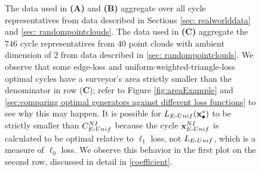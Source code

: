 \begin{figure}[h!]
{The data used in \textbf{(A)} and \textbf{(B)} aggregate over all cycle representatives from data described in Sections \ref{sec: realworlddata} and \ref{sec: randompointclouds}. The data used in \textbf{(C)} aggregate the $746$ cycle representatives from $40$ point clouds with ambient dimension of $2$ from data described in \ref{sec: randompointclouds}. We observe that some edge-loss and uniform-weighted-triangle-loss optimal cycles have a surveyor's area strictly smaller than the denominator in row (\textbf{C}); refer to Figure \ref{fig:areaExample} and \se  \ref{sec:comparing optimal generators against different loss functions} to see why this may happen. It is possible for $L_{E\text{-}Unif}(\mathbf{x}_\bullet^*)$ to be strictly smaller than $C^{NI}_{E\text{-}Unif}$ because the cycle $\mathbf{x}^{NI}_{E\text{-}Unif}$ is calculated to be optimal relative to $\ell_1$ loss, not $L_{E\text{-}Unif}$, which is a measure of $\ell_0$ loss. We observe this behavior in the first plot on the second row, discussed in detail in \se \ref{coefficient}.} 

 \label{fig:lengthcompare}
\end{figure}
\newpage 
 
